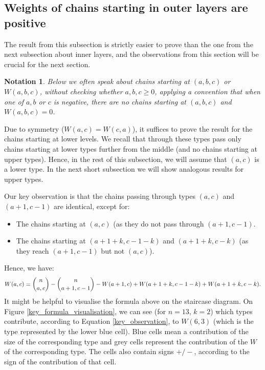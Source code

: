 \documentclass[11pt, reqno]{amsart}
\newtheorem*{notation}{Notation}
\numberwithin{equation}{section}
\begin{document}
\subsection{Weights of chains starting in outer layers are positive}
\label{section_d2_outer}

The result from this subsection is strictly easier to prove than the one from the next subsection about inner layers, and the observations from this section will be crucial for the next section.

\begin{notation}
    Below we often speak about \emph{chains starting at $(a, b, c)$} or $W(a, b, c)$, without checking whether $a, b, c \geqslant 0$, applying a convention that when one of $a, b$ or $c$ is negative, there are no chains starting at $(a, b, c)$ and $W(a, b, c)=0$.
\end{notation}

Due to symmetry ($W(a, c)=W(c, a)$), it suffices to prove the result for the chains starting at lower levels. We recall that through these types pass only chains starting at lower types further from the middle (and no chains starting at upper types). Hence, in the rest of this subsection, we will assume that $(a, c)$ is a lower type. In the next short subsection we will show analogous results for upper types.

Our key observation is that the chains passing through types $(a, c)$ and $(a+1, c-1)$ are identical, except for:
\begin{itemize}
    \item The chains starting at $(a, c)$ (as they do not pass through $(a+1, c-1)$.
    \item The chains starting at $(a+1+k, c-1-k)$ and $(a+1+k, c-k)$ (as they reach $(a+1, c-1)$ but not $(a, c)$).
\end{itemize}
Hence, we have:
\begin{equation}
\label{key_observation}
    W(a, c) = \binom{n}{a, c} - \binom{n}{a+1, c-1} - W(a+1, c) \\
    + W(a+1+k, c-1-k) + W(a+1+k, c-k).
\end{equation}
It might be helpful to visualise the formula above on the staircase diagram. On Figure \ref{key_formula_visualisation}, we can see (for $n=13$, $k=2$) which types contribute, according to Equation \ref{key_observation}, to $W(6, 3)$ (which is the type represented by the lower blue cell). Blue cells mean a contribution of the size of the corresponding type and grey cells represent the contribution of the $W$ of the corresponding type. The cells also contain signs $+/-$, according to the sign of the contribution of that cell.
\end{document}
